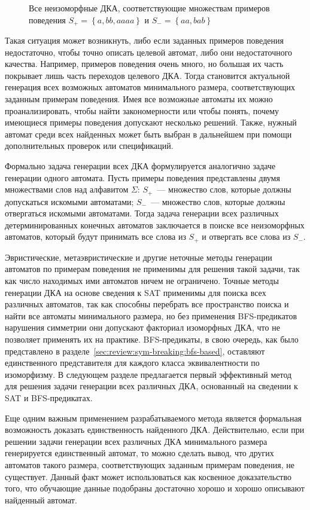 \begin{figure}[ht]
  \centering
  
  \caption{Все неизоморфные ДКА, соответствующие множествам примеров поведения $S_{+} = \left\{a, bb, aaaa\right\}$ и $S_{-}=\left\{aa, bab\right\}$}
  \label{img:find-all}
\end{figure}

Такая ситуация может возникнуть, либо если заданных примеров поведения недостаточно, чтобы точно описать целевой автомат, либо они недостаточного качества.
Например, примеров поведения очень много, но большая их часть покрывает лишь часть переходов целевого ДКА.
Тогда становится актуальной генерация всех возможных автоматов минимального размера, соответствующих заданным примерам поведения.
Имея все возможные автоматы их можно проанализировать, чтобы найти закономерности или чтобы понять, почему имеющиеся примеры поведения допускают несколько решений.
Также, нужный автомат среди всех найденных может быть выбран в дальнейшем при помощи дополнительных проверок или спецификаций.

Формально задача генерации всех ДКА формулируется аналогично задаче генерации одного автомата.
Пусть примеры поведения представлены двумя множествами слов над алфавитом $\Sigma$: $S_{+}$~--- множество слов, которые должны допускаться искомыми автоматами; $S_{-}$~--- множество слов, которые должны отвергаться искомыми автоматами.
Тогда задача генерации всех различных детерминированных конечных автоматов заключается в поиске все неизоморфных автоматов, который будут принимать все слова из $S_{+}$ и отвергать все слова из $S_{-}$.

Эвристические, метаэвристические и другие неточные методы генерации автоматов по примерам поведения не применимы для решения такой задачи, так как число находимых ими автоматов ничем не ограничено.
Точные методы генерации ДКА на основе сведения к SAT применимы для поиска всех различных автоматов, так как способны перебрать все пространство поиска и найти все автоматы минимального размера, но без применения BFS-предикатов нарушения симметрии они допускают факториал изоморфных ДКА, что не позволяет применять их на практике.
BFS-предикаты, в свою очередь, как было представлено в разделе~\ref{sec:review:sym-breaking:bfs-based}, оставляют единственного представителя для каждого класса эквивалентности по изоморфизму.
В следующем разделе предлагается первый эффективный метод для решения задачи генерации всех различных ДКА, основанный на сведении к SAT и BFS-предикатах.

Еще одним важным применением разрабатываемого метода является формальная возможность доказать единственность найденного ДКА.
Действительно, если при решении задачи генерации всех различных ДКА минимального размера генерируется единственный автомат, то можно сделать вывод, что других автоматов такого размера, соответствующих заданным примерам поведения, не существует.
Данный факт может использоваться как косвенное доказательство того, что обучающие данные подобраны достаточно хорошо и хорошо описывают найденный автомат.

